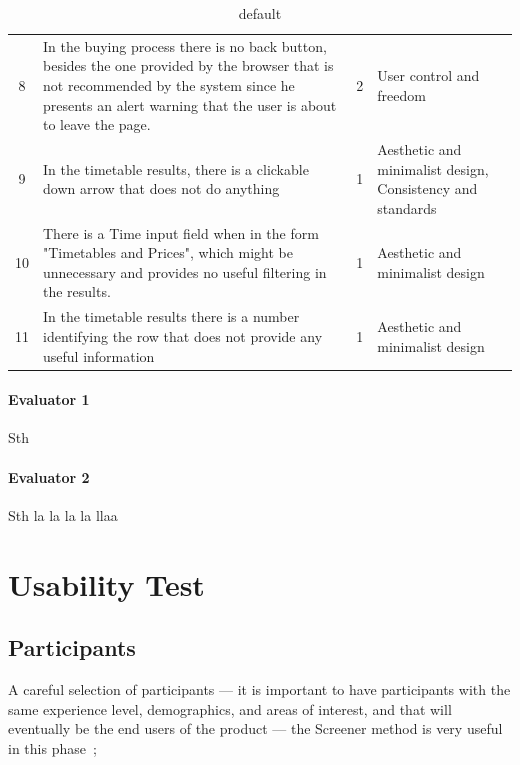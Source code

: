\documentclass[a4paper]{article}
\begin{document}
\begin{table}[h]
\begin{center}
\begin{tabular}{c | p{8cm} | c | p{4.5cm}}
8 & In the buying process there is no back button, besides the one provided by the browser that is not recommended by the system since he presents an alert warning that the user is about to leave the page. & \cellcolor{orange!20}2 & User control and freedom\\

9  &  In the timetable results, there is a clickable down arrow that does not do anything  & \cellcolor{yellow!10} 1 &  Aesthetic and minimalist design, Consistency and standards  \\

	10  &  There is a Time input field when in the form "Timetables and Prices", which might be unnecessary and provides no useful filtering in the results.  & \cellcolor{yellow!10} 1 &  Aesthetic and minimalist design  \\
	
		11 &  In the timetable results there is a number identifying the row that does not provide any useful information & \cellcolor{yellow!10} 1 & Aesthetic and minimalist design\\
	
\hline
\end{tabular}
\end{center}
\caption{default}
\label{heuristic evaluation details}
\end{table}

\paragraph{Evaluator 1} Sth

\paragraph{Evaluator 2} Sth la la la la llaa

\section{Usability Test}

\subsection{Participants}
A careful selection of participants --- it is important to have participants with the same experience level, demographics, and areas of interest, and that will eventually be the end users of the product --- the Screener method is very useful in this phase~\citep{mitchell2007step};
\end{document}
